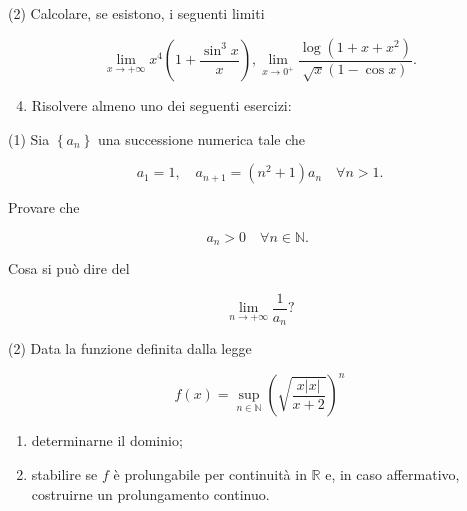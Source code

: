 \documentclass[10pt]{article}
\begin{document}
(2) Calcolare, se esistono, i seguenti limiti

\[
\lim _{x \rightarrow+\infty} x^{4}\left(1+\frac{\sin ^{3} x}{x}\right), \lim _{x \rightarrow 0^{+}} \frac{\log \left(1+x+x^{2}\right)}{\sqrt{x}(1-\cos x)} .
\]

\begin{enumerate}
  \setcounter{enumi}{3}
  \item Risolvere almeno uno dei seguenti esercizi:
\end{enumerate}

(1) Sia \(\left\{a_{n}\right\}\) una successione numerica tale che

\[
a_{1}=1, \quad a_{n+1}=\left(n^{2}+1\right) a_{n} \quad \forall n>1 .
\]

Provare che

\[
a_{n}>0 \quad \forall n \in \mathbb{N} \text {. }
\]

Cosa si può dire del

\[
\lim _{n \rightarrow+\infty} \frac{1}{a_{n}} ?
\]

(2) Data la funzione definita dalla legge

\[
f(x)=\sup _{n \in \mathbb{N}}\left(\sqrt{\frac{x|x|}{x+2}}\right)^{n}
\]

\begin{enumerate}
  \item determinarne il dominio;

  \item stabilire se \(f\) è prolungabile per continuità in \(\mathbb{R}\) e, in caso affermativo, costruirne un prolungamento continuo.

\end{enumerate}
\end{document}
